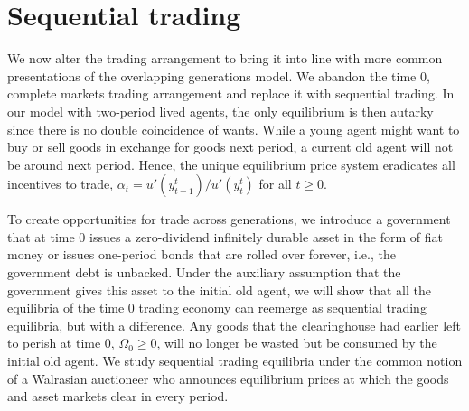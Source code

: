 




\section{Sequential trading}
  We now alter the trading arrangement to bring it
into line with more common presentations of the overlapping
generations model.   We abandon the time $0$, complete markets
 trading  arrangement and replace it with sequential
trading. In our model with two-period lived agents, the 
only equilibrium is then autarky since there is no double
coincidence of wants. While a young agent might want to
buy or sell goods in exchange for 
goods next period, a current old agent will not be
around next period.
Hence, the unique equilibrium price system  eradicates all incentives to trade,
$\alpha_t= u'(y^t_{t+1})/u'(y^t_t)$ for all $t\geq 0$.

To create opportunities for trade across
generations, we introduce a government
that at time $0$ issues a zero-dividend infinitely
durable asset in the form of fiat money or issues
one-period bonds that are rolled over forever, i.e.,
the government debt is unbacked. Under the auxiliary assumption 
that the government gives this asset 
to the initial old agent, we will show that all the 
equilibria of the time $0$ trading economy
can reemerge as sequential trading equilibria, but
with a  difference. Any goods that the clearinghouse 
had earlier left to perish at time $0$, 
$\Omega_0\geq 0$, will no longer be wasted but be
consumed by the initial old agent.
We study sequential trading
equilibria under the common
notion of a Walrasian auctioneer who announces
equilibrium prices at which the goods and asset
markets clear in every period.

